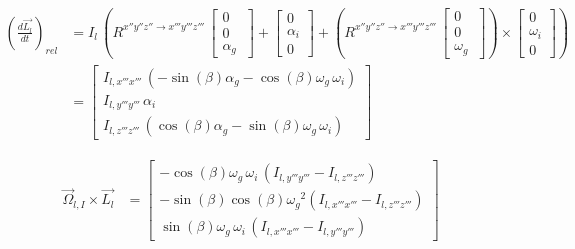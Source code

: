 \begin{align*}
\left(\frac{d\overrightarrow{L_{l}}}{dt}\right)_{rel}&=I_{l}\,\left(R^{x''y''z'' \rightarrow x'''y'''z'''}\,\begin{bmatrix}
0\\
0\\
\alpha_{g}\
\end{bmatrix}
+\begin{bmatrix}
0\\
\alpha_{i}\\
0\
\end{bmatrix}
+\left(R^{x''y''z'' \rightarrow x'''y'''z'''}\,\begin{bmatrix}
0\\
0\\
\omega_{g}\
\end{bmatrix}
\right)\times\begin{bmatrix}
0\\
\omega_{i}\\
0\
\end{bmatrix}
\right)\\
&=\begin{bmatrix}
{I_{l,x'''x'''}}\, \left( -\sin \left( \beta
 \right) \alpha_{g}-\cos \left( \beta \right) \omega_{g}\,\omega_{i}
 \right) \\ 
 {I_{l,y'''y'''}}\,\alpha_{i}
\\ 
%
{I_{l,z'''z'''}}\, \left( \cos \left( \beta
 \right) \alpha_{g}-\sin \left( \beta \right) \omega_{g}\,\omega_{i}
 \right) \
\end{bmatrix}
\end{align*}

\begin{equation*}
\begin{split}
\overrightarrow{\Omega}_{l,I}\times \overrightarrow{L_{l}}&=\begin{bmatrix}
-\cos \left( \beta \right) \omega_{g}\,
\omega_{i}\, \left( { I_{l,y'''y'''}}-{I_{l,z'''z'''}} \right) 
\\ 
-\sin \left( \beta \right) \cos \left( \beta
 \right) {\omega_{g}}^{2} \left( {I_{l,x'''x'''}}-{I_{l,z'''z'''}}
 \right) \\ 
 \sin \left( \beta \right) \omega_{g}\,
\omega_{i}\, \left( {I_{l,x'''x'''}}-{I_{l,y'''y'''}} \right) \
\end{bmatrix}
\end{split}
\end{equation*}

